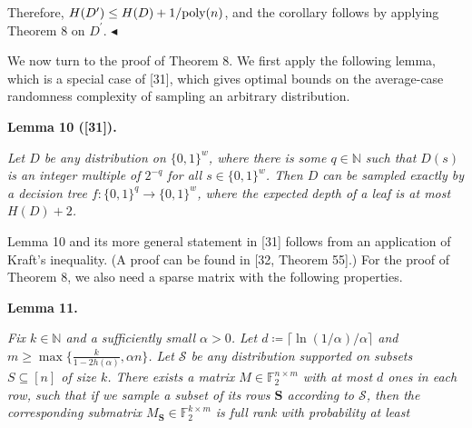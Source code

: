 \documentclass[10pt,a4paper]{article}
\begin{document}
Therefore, $H(D^{\prime})\leq H(D)+1/\textnormal{poly}(n)$, and the corollary follows by applying Theorem 8 on $D^{\prime}$.
$\blacktriangleleft$\par




We now turn to the proof of Theorem 8.
We first apply the following lemma, which is a special case of [31], which gives optimal bounds on the average-case randomness complexity of sampling an arbitrary distribution.\par





\par\medskip\noindent\textbf{
\textbf{Lemma 10}\textbf{ }([31])\textbf{.}
}\par



\emph{Let $D$ be any distribution on $\{0,1\}^{w}$, where there is some $q\in\mathbb{N}$ such that $D(s)$ is an integer multiple of $2^{-q}$ for all $s\in\{0,1\}^{w}$.
Then $D$ can be sampled exactly by a decision tree $f\colon\{0,1\}^{q}\to\{0,1\}^{w}$, where the expected depth of a leaf is at most $H(D)+2$.}\par






Lemma 10 and its more general statement in [31] follows from an application of Kraft’s inequality. (A proof can be found in [32, Theorem 55].)
For the proof of Theorem 8, we also need a sparse matrix with the following properties.\par





\par\medskip\noindent\textbf{
\textbf{Lemma 11}\textbf{.}
}\par



\emph{Fix $k\in\mathbb{N}$ and a sufficiently small $\alpha>0$.
Let $d\coloneq\lceil\ln(1/\alpha)/\alpha\rceil$ and $m\geq\max\{\frac{k}{1-2h(\alpha)},\alpha n\}$.
Let $\mathcal{S}$ be any distribution supported on subsets $S\subseteq[n]$ of size $k$.
There exists a matrix $M\in\mathbb{F}_{2}^{n\times m}$ with at most $d$ ones in each row, such that if we sample a subset of its rows $\boldsymbol{S}$ according to $\mathcal{S}$, then the corresponding submatrix $M_{\boldsymbol{S}}\in\mathbb{F}_{2}^{k\times m}$ is full rank with probability at least}\par
\end{document}
